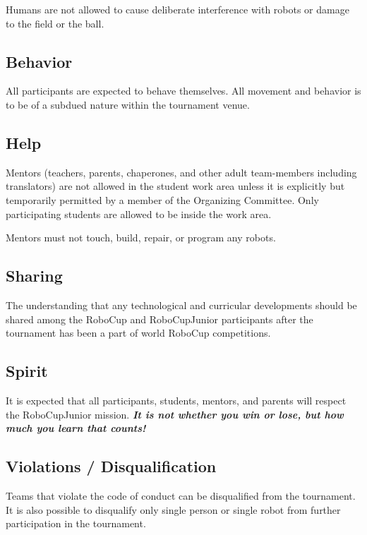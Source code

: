 \documentclass{article}
\begin{document}
Humans are not allowed to cause deliberate interference with robots or damage
to the field or the ball.

\subsection{ Behavior \label{ref-042}}

All participants are expected to behave themselves. All movement and behavior
is to be of a subdued nature within the tournament venue.

\subsection{ Help \label{ref-043}}

Mentors (teachers, parents, chaperones, and other adult team-members including
translators) are not allowed in the student work area unless it is explicitly
but temporarily permitted by a member of the Organizing Committee. Only
participating students are allowed to be inside the work area.

Mentors must not touch, build, repair, or program any robots.

\subsection{ Sharing \label{ref-044}}

The understanding that any technological and curricular developments should be
shared among the RoboCup and RoboCupJunior participants after the tournament
has been a part of world RoboCup competitions.

\subsection{ Spirit \label{ref-045}}

It is expected that all participants, students, mentors, and parents will
respect the RoboCupJunior mission. \textbf{\textit{It is not whether you win or
lose, but how much you learn that counts!}}

\subsection{ Violations / Disqualification \label{ref-046}}

Teams that violate the code of conduct can be disqualified from the tournament.
It is also possible to disqualify only single person or single robot from
further participation in the tournament.
\end{document}
